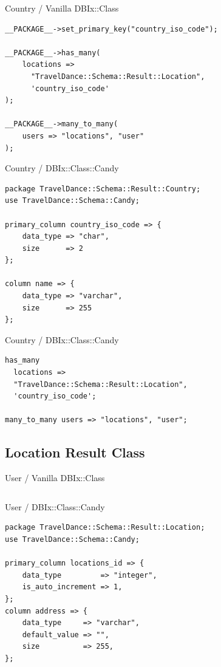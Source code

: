 \begin{frame}[fragile]{Country / Vanilla DBIx::Class}
\begin{lstlisting}
__PACKAGE__->set_primary_key("country_iso_code");

__PACKAGE__->has_many(
    locations =>
      "TravelDance::Schema::Result::Location",
      'country_iso_code'
);

__PACKAGE__->many_to_many(
    users => "locations", "user"
);
\end{lstlisting}
\end{frame}

\begin{frame}[fragile]{Country / DBIx::Class::Candy}
\begin{lstlisting}
package TravelDance::Schema::Result::Country;
use TravelDance::Schema::Candy;

primary_column country_iso_code => {
    data_type => "char",
    size      => 2
};

column name => {
    data_type => "varchar",
    size      => 255
};
\end{lstlisting}
\end{frame}

\begin{frame}[fragile]{Country / DBIx::Class::Candy}
\begin{lstlisting}
has_many
  locations =>
  "TravelDance::Schema::Result::Location",
  'country_iso_code';

many_to_many users => "locations", "user";
\end{lstlisting}
\end{frame}

\subsection{Location Result Class}

\begin{frame}[fragile]{User / Vanilla DBIx::Class}
\begin{lstlisting}

\end{lstlisting}
\end{frame}

\begin{frame}[fragile]{User / DBIx::Class::Candy}
\begin{lstlisting}
package TravelDance::Schema::Result::Location;
use TravelDance::Schema::Candy;

primary_column locations_id => {
    data_type         => "integer",
    is_auto_increment => 1,
};
column address => {
    data_type     => "varchar",
    default_value => "",
    size          => 255,
};
\end{lstlisting}
\end{frame}

